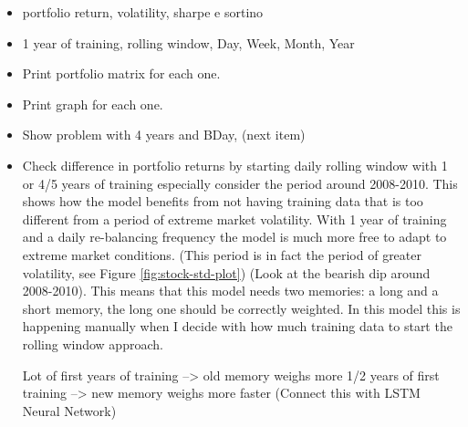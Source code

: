 \begin{itemize}
	\item portfolio return, volatility, sharpe e sortino 
	\item 1 year of training, rolling window, Day, Week, Month, Year
	\item Print portfolio matrix for each one.
	\item Print graph for each one.
	\item Show problem with 4 years and BDay, (next item)
	\item Check difference in portfolio returns by starting daily rolling window with 1 or 4/5 years of training especially consider the period around 2008-2010. This shows how the model benefits from not having training data that is too different from a period of extreme market volatility. With 1 year of training and a daily re-balancing frequency the model is much more free to adapt to extreme market conditions. (This period is in fact the period of greater volatility, see Figure \ref{fig:stock-std-plot})
	(Look at the bearish dip around 2008-2010). This means that this model needs two memories: a long and a short memory, the long one should be correctly weighted. In this model this is happening manually when I decide with how much training data to start the rolling window approach.
	
	Lot of first years of training --> old memory weighs more
	1/2 years of first training --> new memory weighs more faster
	(Connect this with LSTM Neural Network)
\end{itemize}
